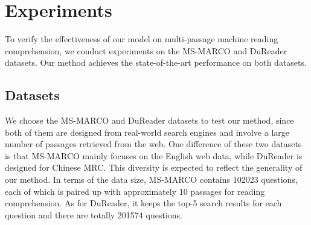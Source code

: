 \section{Experiments}
\label{experiments}

To verify the effectiveness of our model on multi-passage machine reading comprehension,
we conduct experiments on the MS-MARCO \cite{marco} and DuReader \cite{dureader} datasets. Our method achieves the state-of-the-art performance on both datasets.


\subsection{Datasets}
We choose the MS-MARCO and DuReader datasets to test our method, since both of them are designed from real-world search engines and involve a large number of passages retrieved from the web. One difference of these two datasets is that MS-MARCO mainly focuses on the English web data, while DuReader is designed for Chinese MRC. This diversity is expected to reflect the generality of our method. In terms of the data size, MS-MARCO contains 102023 questions, each of which is paired up with approximately 10 passages for reading comprehension. As for DuReader, it keeps the top-5 search results for each question and there are totally 201574 questions.  




